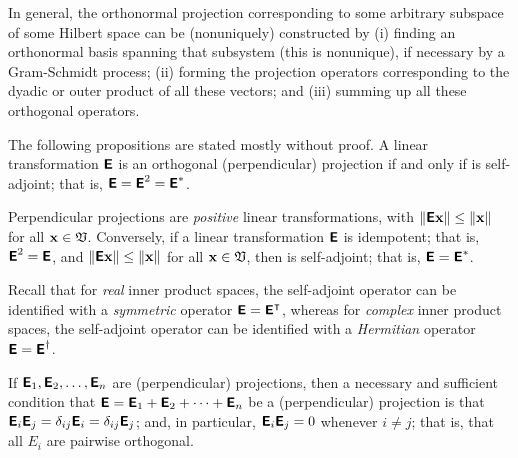 In general, the orthonormal projection corresponding to some arbitrary subspace of some Hilbert space can be (nonuniquely)
constructed by
(i) finding an orthonormal basis spanning that subsystem (this is nonunique),
if necessary by a Gram-Schmidt process;
(ii) forming the projection operators corresponding to the dyadic or outer product
of all these vectors; and
(iii) summing up all these orthogonal operators.


The following propositions are stated mostly without proof.
A  linear transformation $\textsf{\textbf{E}}$ is an orthogonal (perpendicular) projection
if and only if is self-adjoint; that is,
$\textsf{\textbf{E}} = \textsf{\textbf{E}}^2=\textsf{\textbf{E}}^\ast $.

Perpendicular projections are {\em positive} linear transformations,
with
$\left\| \textsf{\textbf{E}}{\bf x} \right\| \le \| {\bf x} \|$
for all
${\bf x} \in {\frak V}$.
Conversely,
if a linear transformation $\textsf{\textbf{E}}$
is idempotent; that is,
$\textsf{\textbf{E}}^2=\textsf{\textbf{E}}$,
and  $\left\| \textsf{\textbf{E}}{\bf x} \right\| \le \| {\bf x} \|$
for all
${\bf x} \in {\frak V}$,
then  is self-adjoint; that is,
$\textsf{\textbf{E}}=\textsf{\textbf{E}}^\ast$.

Recall that
for {\em real} inner product spaces, the self-adjoint operator can be identified with a {\em symmetric} operator
$\textsf{\textbf{E}}=\textsf{\textbf{E}}^\intercal $,
whereas
for {\em complex} inner product spaces, the self-adjoint operator can be identified with a {\em Hermitian} operator
$\textsf{\textbf{E}}=\textsf{\textbf{E}}^\dagger$.


If $\textsf{\textbf{E}}_1,\textsf{\textbf{E}}_2, \ldots , \textsf{\textbf{E}}_n$ are (perpendicular)
projections,
then a necessary and sufficient condition that
$\textsf{\textbf{E}} =\textsf{\textbf{E}}_1+\textsf{\textbf{E}}_2+\cdots +\textsf{\textbf{E}}_n$
be a (perpendicular) projection is that
 $\textsf{\textbf{E}}_i \textsf{\textbf{E}}_j =\delta_{ij}\textsf{\textbf{E}}_i =\delta_{ij}\textsf{\textbf{E}}_j$;
and, in particular,
$\textsf{\textbf{E}}_i \textsf{\textbf{E}}_j =0$
whenever $i\neq j$; that is, that all $E_i$ are pairwise orthogonal.

